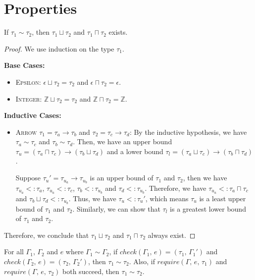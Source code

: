 \documentclass[peerreview, 10pt]{IEEEtran}
\newcommand{\Z}{\ensuremath{\mathbb{Z}}}
\newcommand{\arrowt}[2]{\ensuremath{{#1}\rightarrow{#2}}}
\newcommand{\checktype}[4]{\ensuremath{{check}(#1,\,#2)=(#3,\,#4)}}
\begin{document}
\section*{Properties}

\begin{lemma}
    \label{lem:bound}
    If $\tau_1\sim\tau_2$, then $\tau_1\sqcup\tau_2$ and $\tau_1\sqcap\tau_2$ exists.
\end{lemma}

\begin{proof}
    We use induction on the type $\tau_1$.

    \textbf{Base Cases:}
    \begin{itemize}
        \item \textsc{Epsilon}: $\epsilon\sqcup\tau_2=\tau_2$ and $\epsilon\sqcap\tau_2=\epsilon$.
        \item \textsc{Integer}: $\Z\sqcup\tau_2=\tau_2$ and $\Z\sqcap\tau_2=\Z$.
    \end{itemize}

    \textbf{Inductive Cases:}
    \begin{itemize}
        \item \textsc{Arrow} $\tau_1=\arrowt{\tau_a}{\tau_b}$ and $\tau_2=\arrowt{\tau_c}{\tau_d}$: By the inductive hypothesis, we have $\tau_a\sim\tau_c$ and $\tau_b\sim\tau_d$. Then, we have an upper bound $\tau_u=\arrowt{(\tau_a\sqcap\tau_c)}{(\tau_b\sqcup\tau_d)}$ and a lower bound $\tau_l=\arrowt{(\tau_a\sqcup\tau_c)}{(\tau_b\sqcap\tau_d)}$.
        
        Suppose $\tau_u'=\arrowt{\tau_{u_a}}{\tau_{u_b}}$ is an upper bound of $\tau_1$ and $\tau_2$, then we have $\tau_{u_a} <: \tau_a$, $\tau_{u_a} <: \tau_c$, $\tau_b <: \tau_{u_b}$ and $\tau_d <: \tau_{u_b}$. Therefore, we have $\tau_{u_a} <: \tau_a\sqcap\tau_c$ and $\tau_b\sqcup\tau_d <: \tau_{u_b}$. Thus, we have $\tau_u <: \tau_u'$, which means $\tau_u$ is a least upper bound of $\tau_1$ and $\tau_2$. Similarly, we can show that $\tau_l$ is a greatest lower bound of $\tau_1$ and $\tau_2$.
    \end{itemize}

    Therefore, we conclude that $\tau_1\sqcup\tau_2$ and $\tau_1\sqcap\tau_2$ always exist.
\end{proof}

\begin{lemma}
    \label{lem:same-kind}
    For all $\Gamma_1$, $\Gamma_2$ and $e$ where $\Gamma_1\sim\Gamma_2$, if $\checktype{\Gamma_1}{e}{\tau_1}{\Gamma_1'}$ and $\checktype{\Gamma_2}{e}{\tau_2}{\Gamma_2'}$, then $\tau_1\sim\tau_2$. Also, if $require(\Gamma,\,e,\,\tau_1)$ and $require(\Gamma,\,e,\,\tau_2)$ both succeed, then $\tau_1\sim\tau_2$.
\end{lemma}
\end{document}
